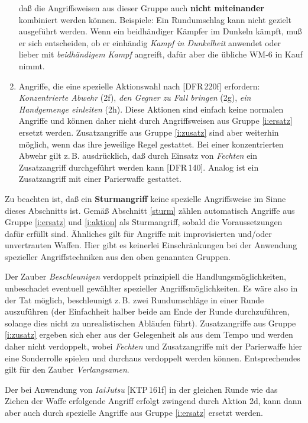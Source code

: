 \documentclass[10pt,a4paper,germanpar]{article}
\begin{document}
\begin{enumerate}
  daß die Angriffsweisen aus dieser Gruppe auch \textbf{nicht
    miteinander} kombiniert werden können. Beispiele: Ein Rundumschlag
  kann nicht gezielt ausgeführt werden. Wenn ein beidhändiger Kämpfer
  im Dunkeln kämpft, muß er sich entscheiden, ob er einhändig
  \emph{Kampf in Dunkelheit} anwendet oder lieber mit
  \emph{beidhändigem Kampf} angreift, dafür aber die übliche WM-6 in
  Kauf nimmt.
\item \label{i:aktion} Angriffe, die eine spezielle Aktionswahl nach
  [DFR\,220f] erfordern: \emph{Konzentrierte Abwehr} (2f), \emph{den
    Gegner zu Fall bringen} (2g), \emph{ein Handgemenge einleiten}
  (2h). Diese Aktionen sind einfach keine normalen Angriffe und können
  daher nicht durch Angriffsweisen aus Gruppe \ref{i:ersatz} ersetzt
  werden. Zusatzangriffe aus Gruppe \ref{i:zusatz} sind aber weiterhin
  möglich, wenn das ihre jeweilige Regel gestattet. Bei einer
  konzentrierten Abwehr gilt z.\,B. ausdrücklich, daß durch Einsatz
  von \emph{Fechten} ein Zusatzangriff durchgeführt werden kann
  [DFR\,140]. Analog ist ein Zusatzangriff mit einer Parierwaffe
  gestattet.
\end{enumerate}

Zu beachten ist, daß ein \textbf{Sturmangriff} keine spezielle
Angriffsweise im Sinne dieses Abschnitts ist. Gemäß Abschnitt
\ref{sturm} zählen automatisch Angriffe aus Gruppe \ref{i:ersatz} und
\ref{i:aktion} als Sturmangriff, sobald die Voraussetzungen dafür
erfüllt sind. Ähnliches gilt für Angriffe mit improvisierten und/oder
unvertrauten Waffen. Hier gibt es keinerlei Einschränkungen bei der
Anwendung spezieller Angriffstechniken aus den oben genannten Gruppen.

Der Zauber \emph{Beschleunigen} verdoppelt prinzipiell die
Handlungsmöglichkeiten, unbeschadet eventuell gewählter spezieller
Angriffsmöglichkeiten. Es wäre also in der Tat möglich, beschleunigt
z.\,B. zwei Rundumschläge in einer Runde auszuführen (der Einfachheit
halber beide am Ende der Runde durchzuführen, solange dies nicht zu
unrealistischen Abläufen führt). Zusatzangriffe aus Gruppe
\ref{i:zusatz} ergeben sich eher aus der Gelegenheit als aus dem Tempo
und werden daher nicht verdoppelt, wobei \emph{Fechten} und
Zusatzangriffe mit der Parierwaffe hier eine Sonderrolle spielen und
durchaus verdoppelt werden können. Entsprechendes gilt für den Zauber
\emph{Verlangsamen}.

Der bei Anwendung von \emph{IaiJutsu} [KTP\,161f] in der gleichen
Runde wie das Ziehen der Waffe erfolgende Angriff erfolgt zwingend
durch Aktion 2d, kann dann aber auch durch spezielle Angriffe aus
Gruppe \ref{i:ersatz} ersetzt werden.
\end{document}

